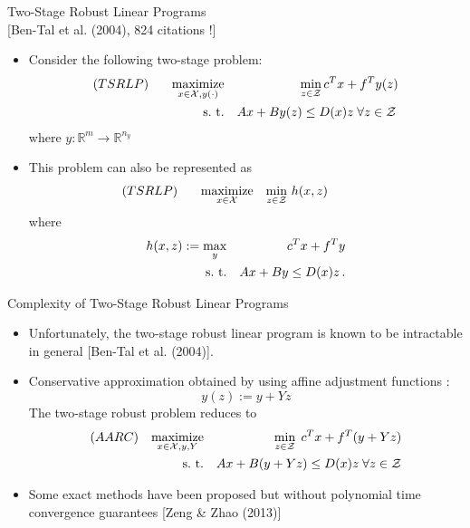\documentclass[xcolor=x11names,compress]{beamer}
\renewcommand{\(}{\begin{columns}}
\renewcommand{\)}{\end{columns}}
\newcommand{\<}[1]{\begin{column}{#1}}
\renewcommand{\>}{\end{column}}
\def\maximize{\mathop{\rm maximize}}
\def\subto{{\rm s. \mbox{ }\rm t.}}
\def\min{\mathop{\rm min}}
\def\max{\mathop{\rm max}}
\newcommand{\X}{\mathcal{X}}
\newcommand{\0}{\V{0}}
\newcommand{\1}{\V{1}}
\renewcommand{\Re}{\mathbb{R}}
\newcommand{\Z}{\mathcal{Z}}
\begin{document}
\begin{frame}{Two-Stage Robust Linear Programs\\{\footnotesize [Ben-Tal et al. (2004), 824 citations !]}}
\begin{itemize}
\item Consider the following two-stage problem:
\begin{eqnarray*}
(TSRLP) \;\;\;\;\;\;\maximize_{x\in\X,y(\cdot)}&&\min_{z\in\Z} c^Tx+f^Ty(z)\\
\subto &&Ax+By(z)\le D(x) z\;\forall z\in\Z\,
\end{eqnarray*}
where $y:\Re^m\rightarrow \Re^{n_y}$
%
\pause\item This problem can also be represented as
\begin{eqnarray*}\label{TSRO}
(TSRLP) \;\;\;\;\;\;\maximize_{x\in\X}&& \min_{z\in\Z}\,h(x,z)\;\;\;\;\;\;\;\;\;\;\;\;
\end{eqnarray*}
where
\begin{eqnarray*}
h(x,z):= \max_{y}&& c^Tx + f^Ty\\
\subto &&Ax+By\le D(x) z\,.
\end{eqnarray*}
\end{itemize}
\end{frame}
\begin{frame}{Complexity of Two-Stage Robust Linear Programs}

\begin{itemize}
\item Unfortunately, the  two-stage robust linear program
is known to be intractable in general {\footnotesize [Ben-Tal et al. (2004)].}
\pause\vspace{0.3cm}\item Conservative approximation obtained by using affine adjustment functions : \[y(z):=y+Yz\]
The two-stage robust problem reduces to
\begin{eqnarray*}
(AARC) \;\;\;\maximize_{x\in\X,y,Y}&&\;\min_{z\in\Z} \;c^Tx+ f^T(y+Yz)\\
\subto &&Ax+B(y+Yz)\le D(x)z\;\forall z\in\Z
\end{eqnarray*}
\pause\vspace{0.1cm}\item Some exact methods have been proposed but without polynomial time convergence guarantees
{\footnotesize [Zeng \& Zhao (2013)]}
\end{itemize}


\end{frame}
\end{document}
